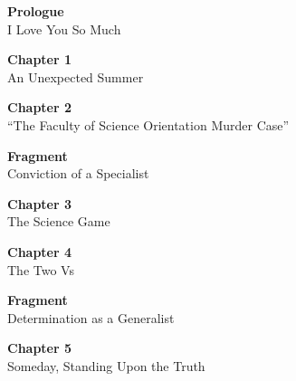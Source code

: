 \documentclass[
    a4paper,
    12pt,
    twoside,
    openany,
    UTF8,
    fontset=windows
]{ctexbook}
\begin{document}
\hspace*{\fill}
\begin{minipage}{0.88\textwidth}
    \begin{flushright}
        \vspace*{-1.0cm}
    \end{flushright}
    
    \vspace{0.6cm}
    
    \begin{flushleft}
    \begin{list}{}{
        \setlength{\leftmargin}{0pt}
        \setlength{\labelwidth}{0pt}
        \setlength{\itemindent}{0pt}
        \setlength{\parsep}{0.5ex}
        \setlength{\topsep}{0pt}
        \setlength{\partopsep}{0pt}
        \setlength{\itemsep}{0pt}
    }
        \item \textbf{Prologue} \dotfill \pageref{sec:prologueV3} \\[-0.1ex]
        I Love You So Much
        
        \item \textbf{Chapter 1} \dotfill \pageref{sec:ch1V3} \\[-0.1ex]
        An Unexpected Summer
        
        \item \textbf{Chapter 2} \dotfill \pageref{sec:ch2V3} \\[-0.1ex]
        ``The Faculty of Science Orientation Murder Case''
        
        \item \textbf{Fragment} \dotfill \pageref{sec:fragConviction} \\[-0.1ex]
        Conviction of a Specialist
        
        \item \textbf{Chapter 3} \dotfill \pageref{sec:ch3V3} \\[-0.1ex]
        The Science Game
        
        \item \textbf{Chapter 4} \dotfill \pageref{sec:ch4V3} \\[-0.1ex]
        The Two Vs
        
        \item \textbf{Fragment} \dotfill \pageref{sec:fragDetermination} \\[-0.1ex]
        Determination as a Generalist
        
        \item \textbf{Chapter 5} \dotfill \pageref{sec:ch5V3} \\[-0.1ex]
        Someday, Standing Upon the Truth
        

\end{list}
\end{flushleft}
\end{minipage}
\end{document}
